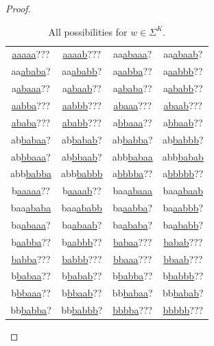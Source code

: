 \begin{proof}
\begin{table}[ht]
\centering
\begin{tabular}{c c c c}
\hline \hline
\underline{aaaaa}??? & \underline{aaaab}??? &
aa\underline{abaaa}? & aa\underline{abaab}?\\
aa\underline{ababa}? & aa\underline{ababb}? &
a\underline{aabba}?? & a\underline{aabbb}??\\
a\underline{abaaa}?? & a\underline{abaab}?? &
a\underline{ababa}?? & a\underline{ababb}??\\
\underline{aabba}??? & \underline{aabbb}??? &
\underline{abaaa}??? & \underline{abaab}???\\
\underline{ababa}??? & \underline{ababb}??? &
a\underline{bbaaa}?? & a\underline{bbaab}??\\
ab\underline{babaa}? & ab\underline{babab}? &
ab\underline{babba}? & ab\underline{babbb}?\\
ab\underline{bbaaa}? & ab\underline{bbaab}? &
abb\underline{babaa} & abb\underline{babab}\\
abb\underline{babba} & abb\underline{babbb} &
a\underline{bbbba}?? & a\underline{bbbbb}??\\
b\underline{aaaaa}?? & b\underline{aaaab}?? &
baa\underline{abaaa} & baa\underline{abaab}\\
baa\underline{ababa} & baa\underline{ababb} &
ba\underline{aabba}? & ba\underline{aabbb}?\\
ba\underline{abaaa}? & ba\underline{abaab}? &
ba\underline{ababa}? & ba\underline{ababb}?\\
b\underline{aabba}?? & b\underline{aabbb}?? &
\underline{babaa}??? & \underline{babab}???\\
\underline{babba}??? & \underline{babbb}??? &
\underline{bbaaa}??? & \underline{bbaab}???\\
b\underline{babaa}?? & b\underline{babab}?? &
b\underline{babba}?? & b\underline{babbb}??\\
b\underline{bbaaa}?? & b\underline{bbaab}?? &
bb\underline{babaa}? & bb\underline{babab}?\\
bb\underline{babba}? & bb\underline{babbb}? &
\underline{bbbba}??? & \underline{bbbbb}???\\
\hline
\end{tabular}
\caption{All possibilities for $w \in \Sigma^K$.}
\label{table:dxclra_verify2}
\end{table}


\end{proof}
